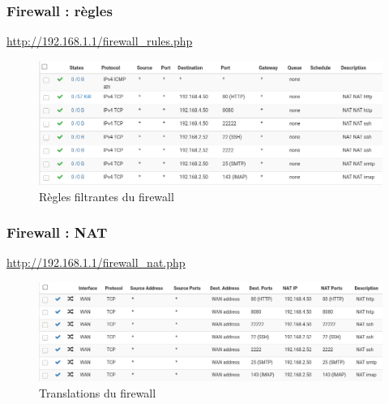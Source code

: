 \documentclass{beamer}
\begin{document}
		\begin{frame}
			\frametitle{Firewall : règles}
			\url{http://192.168.1.1/firewall_rules.php}
			\begin{center}
				\begin{figure}
					\includegraphics[scale=.3]{rule.png}
					\caption{Règles filtrantes du firewall}
				\end{figure}
			\end{center}
		\end{frame}
		\begin{frame}
			\frametitle{Firewall : NAT}
			\url{http://192.168.1.1/firewall_nat.php}
			\begin{center}
				\begin{figure}
					\includegraphics[scale=.3]{nat.png}
					\caption{Translations du firewall}
				\end{figure}
			\end{center}
		\end{frame}
\end{document}
